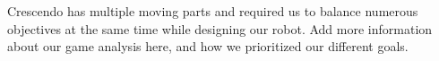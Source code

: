 Crescendo has multiple moving parts and required us to balance numerous
objectives at the same time while designing our robot. Add more
information about our game analysis here, and how we prioritized our
different goals.
\blindtext